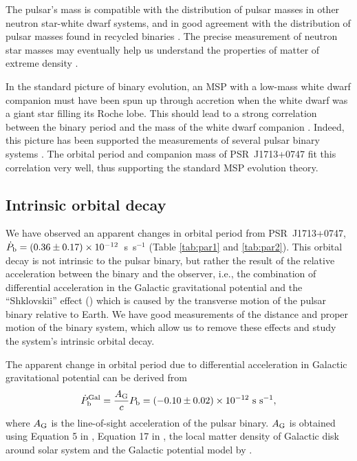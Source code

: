 The pulsar's mass is compatible with the distribution of pulsar masses
in other neutron star-white dwarf systems, and in good
agreement with the distribution of pulsar masses found in recycled binaries
\citep{opns12,kkdt13}. The precise measurement of neutron star masses 
may eventually help us understand the properties of matter of extreme 
density \citep{dpr+10, lat12, afw+13}.

In the standard picture of binary evolution, an MSP with a low-mass white dwarf companion must have been spun up through accretion when the white dwarf was a giant star filling its Roche lobe. 
This should lead to a strong correlation between the binary period and the mass of the white dwarf companion \citep{rpj+95, ts99a, prp02b}. 
Indeed, this picture has been supported the measurements of several pulsar
binary systems \citep[e.g.,][]{vbb+01, ktr94, th14, rsa+14}.  
The orbital period and companion mass of PSR~J1713+0747 fit
this correlation very well, thus supporting the standard MSP evolution theory. 


\subsection{Intrinsic orbital decay}
\label{sec:obdecay}
We have observed an apparent changes in orbital period from PSR~J1713+0747, $\dot{P}_{\rm b} =
(0.36\pm0.17)\times10^{-12}$~s~s$^{-1}$ (Table \ref{tab:par1} and \ref{tab:par2}).
This orbital decay is not intrinsic to the pulsar binary, but rather the
result of the relative acceleration between the binary and the
observer, i.e., the combination of differential acceleration in the Galactic gravitational potential
\citep{dt91} and the ``Shklovskii'' effect (\citealt{shk70}) which is caused
by the transverse motion of the pulsar binary relative to Earth. We have good measurements of the distance and proper
motion of the binary system, which allow us to remove these effects and study the system's intrinsic orbital decay.

The apparent change in orbital period due to differential acceleration in
Galactic gravitational potential can be derived from
\begin{equation}
\dot{P}_{\rm b}^{\rm Gal} = \frac{A_{\rm G}}{c} P_{\rm b} =
(-0.10\pm0.02)\times10^{-12}~{\rm s~s^{-1}},
\end{equation}
where $A_{\rm G}$ is the line-of-sight acceleration of the pulsar binary.
$A_{\rm G}$ is obtained using
Equation 5 in \citet{nt95}, Equation 17 in \citet{lwj+09}, the
local matter density of Galactic disk around solar system \citep{hf04a}
and the Galactic potential model by \citet{rmb+14}.


